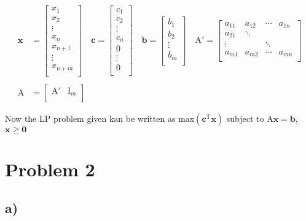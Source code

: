 \documentclass{article}
\renewcommand{\vec}[1]{\mathbf{#1}}
\begin{document}
\begin{align*}
  \vec{x} &=
  \begin{bmatrix}
    x_1 \\
    x_2 \\
    \vdots \\
    x_n \\
    x_{n+1} \\
    \vdots \\
    x_{n+m} \\
  \end{bmatrix}
  \quad
  \vec{c} =
  \begin{bmatrix}
    c_1 \\
    c_2 \\
    \vdots \\
    c_n \\
    0 \\
    \vdots \\
    0 \\
  \end{bmatrix}
  \quad
  \vec{b} =
  \begin{bmatrix}
    b_1 \\
    b_2 \\
    \vdots \\
    b_m \\
  \end{bmatrix} \quad
  \mathrm{A'} =
  \begin{bmatrix}
    a_{11} & a_{12} & \cdots & a_{1n} \\
    a_{21} & \ddots &  & \\
    \vdots &  & \ddots &\\
    a_{m1} & a_{m2} & \cdots & a_{mn} \\
  \end{bmatrix} \\ \ \\
  \mathrm{A} &= \begin{bmatrix}
    \mathrm{A'} & \mathrm{I}_m \\
  \end{bmatrix}
\end{align*}

Now the LP problem given kan be written as max$(\vec{c}^\mathrm{T}\vec{x})$ subject to $\mathrm{A}\vec{x} = \vec{b} $, $\vec{x} \geq \vec{0}$


\section*{Problem 2}
\subsection*{a)}
\end{document}
